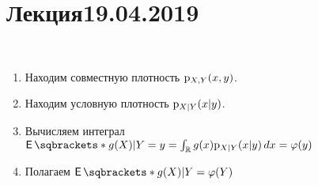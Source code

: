 \section{Лекция19.04.2019}
\begin{remark}
    \par~
    \begin{enumerate}
        \item Находим совместную плотность \(\mathrm{p}_{X, Y}{\left(x, y\right)}\).
        \item Находим условную плотность \(\mathrm{p}_{X | Y}{\left(x | y\right)}\).
        \item Вычисляем интеграл \(\E{g(X) | Y = y} = \int_\R g(x) \p{X | Y}{x | y} \diff x = \phi(y)\)
        \item Полагаем \(\E{g(X) | Y} = \phi(Y)\)
    \end{enumerate}
\end{remark}

